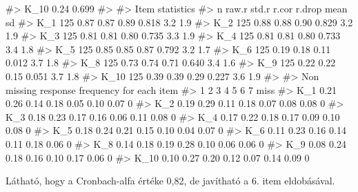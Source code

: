 \documentclass[
  letterpaper,
]{krantz}
\makeatletter
\newenvironment{Shaded}{\begin{snugshade}}{\end{snugshade}}
\newcommand{\CommentTok}[1]{\textcolor[rgb]{0.37,0.37,0.37}{#1}}
\newenvironment{kframe}{%
\medskip{}
\setlength{\fboxsep}{.8em}
 \def\at@end@of@kframe{}%
 \ifinner\ifhmode%
  \def\at@end@of@kframe{\end{minipage}}%
  \begin{minipage}{\columnwidth}%
 \fi\fi%
 \def\FrameCommand##1{\hskip\@totalleftmargin \hskip-\fboxsep
 \colorbox{shadecolor}{##1}\hskip-\fboxsep
     \hskip-\linewidth \hskip-\@totalleftmargin \hskip\columnwidth}%
 \MakeFramed {\advance\hsize-\width
   \@totalleftmargin\z@ \linewidth\hsize
   \@setminipage}}%
 {\par\unskip\endMakeFramed%
 \at@end@of@kframe}
\renewenvironment{Shaded}{\begin{kframe}}{\end{kframe}}
\makeatother
\begin{document}
\begin{Shaded}
\begin{Highlighting}[]
\CommentTok{\#\textgreater{} K\_10  0.24 0.699}
\CommentTok{\#\textgreater{} }
\CommentTok{\#\textgreater{}  Item statistics }
\CommentTok{\#\textgreater{}        n raw.r std.r r.cor r.drop mean  sd}
\CommentTok{\#\textgreater{} K\_1  125  0.87  0.87  0.89  0.818  3.2 1.9}
\CommentTok{\#\textgreater{} K\_2  125  0.88  0.88  0.90  0.829  3.2 1.9}
\CommentTok{\#\textgreater{} K\_3  125  0.81  0.81  0.80  0.735  3.3 1.9}
\CommentTok{\#\textgreater{} K\_4  125  0.81  0.81  0.80  0.733  3.4 1.8}
\CommentTok{\#\textgreater{} K\_5  125  0.85  0.85  0.87  0.792  3.2 1.7}
\CommentTok{\#\textgreater{} K\_6  125  0.19  0.18  0.11  0.012  3.7 1.8}
\CommentTok{\#\textgreater{} K\_8  125  0.73  0.74  0.71  0.640  3.4 1.6}
\CommentTok{\#\textgreater{} K\_9  125  0.22  0.22  0.15  0.051  3.7 1.8}
\CommentTok{\#\textgreater{} K\_10 125  0.39  0.39  0.29  0.227  3.6 1.9}
\CommentTok{\#\textgreater{} }
\CommentTok{\#\textgreater{} Non missing response frequency for each item}
\CommentTok{\#\textgreater{}         1    2    3    4    5    6    7 miss}
\CommentTok{\#\textgreater{} K\_1  0.21 0.26 0.14 0.18 0.05 0.10 0.07    0}
\CommentTok{\#\textgreater{} K\_2  0.19 0.29 0.11 0.18 0.07 0.08 0.08    0}
\CommentTok{\#\textgreater{} K\_3  0.18 0.23 0.17 0.16 0.06 0.11 0.08    0}
\CommentTok{\#\textgreater{} K\_4  0.17 0.22 0.18 0.17 0.09 0.10 0.08    0}
\CommentTok{\#\textgreater{} K\_5  0.18 0.24 0.21 0.15 0.10 0.04 0.07    0}
\CommentTok{\#\textgreater{} K\_6  0.11 0.23 0.16 0.14 0.11 0.18 0.06    0}
\CommentTok{\#\textgreater{} K\_8  0.14 0.18 0.19 0.28 0.10 0.06 0.06    0}
\CommentTok{\#\textgreater{} K\_9  0.08 0.24 0.18 0.16 0.10 0.17 0.06    0}
\CommentTok{\#\textgreater{} K\_10 0.10 0.27 0.20 0.12 0.07 0.14 0.09    0}
\end{Highlighting}
\end{Shaded}

Látható, hogy a Cronbach-alfa értéke 0,82, de javítható a 6. item
eldobásával.
\end{document}
